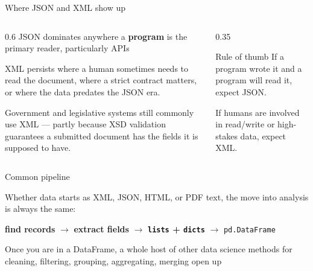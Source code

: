 \documentclass[9pt,aspectratio=169]{beamer}
\begin{document}
\begin{frame}{Where JSON and XML show up}
    \begin{columns}[T]
        \begin{column}{0.6\textwidth}
            JSON dominates anywhere a \textbf{program} is the primary reader, particularly APIs

            \medskip
            XML persists where a human sometimes needs to read the document, where a strict contract matters, or where the data predates the JSON era.

            \medskip
            Government and legislative systems still commonly use XML --- partly because XSD validation guarantees a submitted document has the fields it is supposed to have.
        \end{column}
        \begin{column}{0.35\textwidth}
            \begin{alertblock}{Rule of thumb}
                \footnotesize 
                If a program wrote it and a program will read it, expect JSON.

                \medskip
                If humans are involved in read/write or high-stakes data, expect XML.
            \end{alertblock}
        \end{column}
    \end{columns}
\end{frame}

\begin{frame}{Common pipeline}

            Whether data starts as XML, JSON, HTML, or PDF text, the move into analysis is always the same:

            \medskip
            \begin{center}
                \textbf{find records} $\rightarrow$ \textbf{extract fields} $\rightarrow$ \textbf{\texttt{lists} + \texttt{dicts}} $\rightarrow$ \texttt{pd.DataFrame}
            \end{center}

            \medskip
            Once you are in a DataFrame, a whole host of other data science methods for cleaning, filtering, grouping, aggregating, merging open up
\end{frame}
\end{document}
